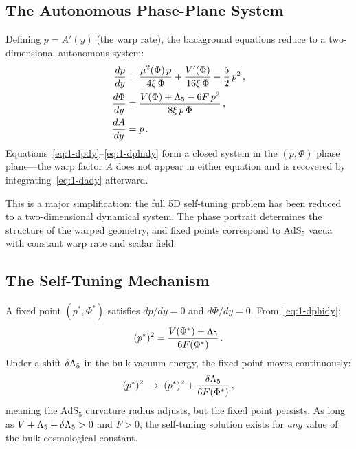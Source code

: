 \subsection{The Autonomous Phase-Plane System}
\label{sec:1-phase-plane}

Defining $p = A'(y)$ (the warp rate), the background equations reduce to a two-dimensional autonomous system:
\begin{align}
\frac{dp}{dy} &= \frac{\mu^2(\Phi)\, p}{4\xi\,\Phi} + \frac{V'(\Phi)}{16\xi\,\Phi} - \frac{5}{2}\,p^2\,, \label{eq:1-dpdy}\\
\frac{d\Phi}{dy} &= \frac{V(\Phi) + \Lambda_5 - 6F\, p^2}{8\xi\, p\,\Phi}\,, \label{eq:1-dphidy}\\
\frac{dA}{dy} &= p\,. \label{eq:1-dady}
\end{align}
Equations~\eqref{eq:1-dpdy}--\eqref{eq:1-dphidy} form a closed system in the $(p, \Phi)$ phase plane---the warp factor $A$ does not appear in either equation and is recovered by integrating~\eqref{eq:1-dady} afterward.

This is a major simplification: the full 5D self-tuning problem has been reduced to a two-dimensional dynamical system. The phase portrait determines the structure of the warped geometry, and fixed points correspond to $\mathrm{AdS}_5$ vacua with constant warp rate and scalar field.

\subsection{The Self-Tuning Mechanism}
\label{sec:1-mechanism}

A fixed point $(p^*, \Phi^*)$ satisfies $dp/dy = 0$ and $d\Phi/dy = 0$. From~\eqref{eq:1-dphidy}:
\begin{equation}
\label{eq:1-fixed-point}
(p^*)^2 = \frac{V(\Phi^*) + \Lambda_5}{6F(\Phi^*)}\,.
\end{equation}
Under a shift $\delta\Lambda_5$ in the bulk vacuum energy, the fixed point moves continuously:
\begin{equation}
\label{eq:1-shift}
(p^*)^2 \;\to\; (p^*)^2 + \frac{\delta\Lambda_5}{6F(\Phi^*)}\,,
\end{equation}
meaning the $\mathrm{AdS}_5$ curvature radius adjusts, but the fixed point persists. As long as $V + \Lambda_5 + \delta\Lambda_5 > 0$ and $F > 0$, the self-tuning solution exists for \emph{any} value of the bulk cosmological constant.

